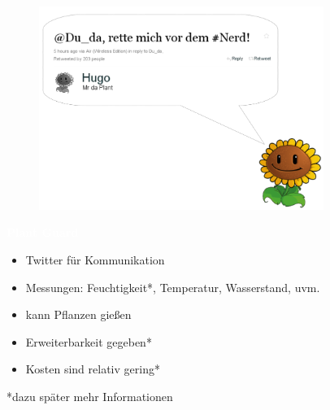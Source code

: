 \documentclass[bigger]{beamer}
\newcommand{\topic}[1]{{\huge{\textcolor{white}{\textbf{#1}}}}}
\begin{document}
{
%
\begin{frame}
	\begin{figure}[H]
		\includegraphics[width=350px]{SprechblaseOR.png}
	\end{figure}

\end{frame}
}

\begin{frame}{\topic{Plant Guard}}
   \begin{itemize}
      \item Twitter für Kommunikation
      \item Messungen: Feuchtigkeit*, Temperatur, Wasserstand, uvm.
      \item kann Pflanzen gießen
      \item Erweiterbarkeit gegeben*
      \item Kosten sind relativ gering*
   \end{itemize}
*dazu später mehr Informationen
\end{frame}
\end{document}
